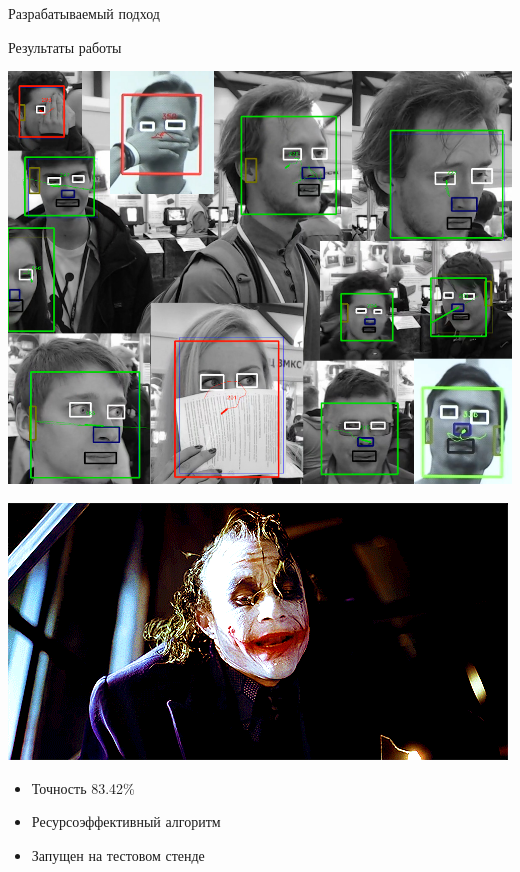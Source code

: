 \documentclass[
  russian,
  ignorenonframetext,
]{beamer}
\providecommand{\tightlist}{%
  \setlength{\itemsep}{0pt}\setlength{\parskip}{0pt}}
\begin{document}
\begin{frame}
\begin{block}{Разрабатываемый подход}
\end{block}

\begin{block}{Результаты работы}

\begin{block}{}

\includegraphics{pics/results.png}

\end{block}

\begin{block}{}

\includegraphics{pics/giphy.gif}

\end{block}

\begin{block}{}

\begin{itemize}
\tightlist
\item
  Точность 83.42\%
\item
  Ресурсоэффективный алгоритм
\item
  Запущен на тестовом стенде
\end{itemize}


\end{block}
\end{block}
\end{frame}
\end{document}
